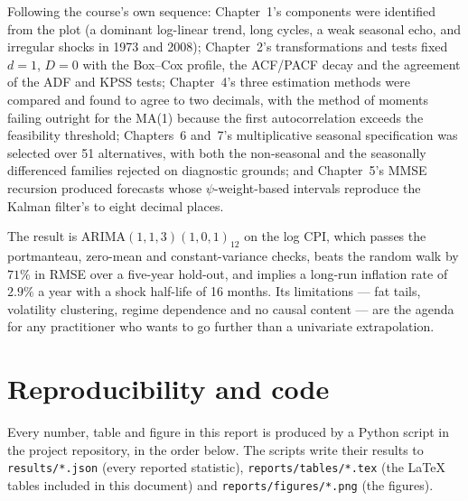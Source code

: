 Following the course's own sequence: Chapter~1's components were identified from
the plot (a dominant log-linear trend, long cycles, a weak seasonal echo, and
irregular shocks in 1973 and 2008); Chapter~2's transformations and tests fixed
$d=1$, $D=0$ with the Box--Cox profile, the ACF/PACF decay and the agreement of the
ADF and KPSS tests; Chapter~4's three estimation methods were compared and found to
agree to two decimals, with the method of moments failing outright for the MA(1)
because the first autocorrelation exceeds the feasibility threshold; Chapters~6
and~7's multiplicative seasonal specification was selected over 51 alternatives,
with both the non-seasonal and the seasonally differenced families rejected on
diagnostic grounds; and Chapter~5's MMSE recursion produced forecasts whose
$\psi$-weight-based intervals reproduce the Kalman filter's to eight decimal
places.

The result is ARIMA$(1,1,3)(1,0,1)_{12}$ on the log CPI, which passes the
portmanteau, zero-mean and constant-variance checks, beats the random walk by
$71\%$ in RMSE over a five-year hold-out, and implies a long-run inflation rate of
$2.9\%$ a year with a shock half-life of 16 months. Its limitations --- fat tails,
volatility clustering, regime dependence and no causal content --- are the agenda
for any practitioner who wants to go further than a univariate extrapolation.

\clearpage
\appendix
\section{Reproducibility and code}
\label{app:code}

Every number, table and figure in this report is produced by a Python script in the
project repository, in the order below. The scripts write their results to
\texttt{results/*.json} (every reported statistic), \texttt{reports/tables/*.tex}
(the \LaTeX{} tables included in this document) and
\texttt{reports/figures/*.png} (the figures).

